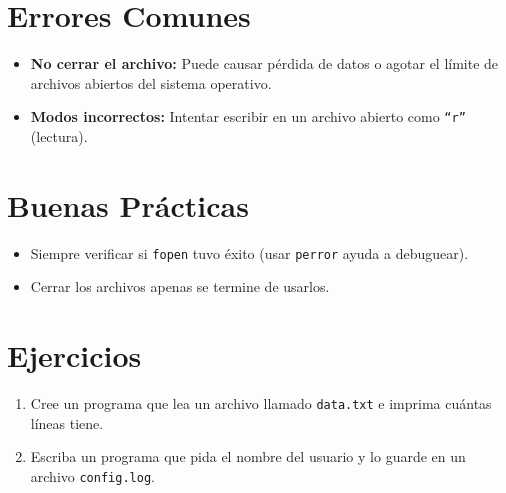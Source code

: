 \documentclass[12pt,a4paper]{article}
\begin{document}
\section{Errores Comunes}
\begin{itemize}
    \item \textbf{No cerrar el archivo:} Puede causar pérdida de datos o agotar el límite de archivos abiertos del sistema operativo.
    \item \textbf{Modos incorrectos:} Intentar escribir en un archivo abierto como \texttt{``r''} (lectura).
\end{itemize}

\section{Buenas Prácticas}
\begin{itemize}
    \item Siempre verificar si \texttt{fopen} tuvo éxito (usar \texttt{perror} ayuda a debuguear).
    \item Cerrar los archivos apenas se termine de usarlos.
\end{itemize}

\section{Ejercicios}
\begin{enumerate} 
    \item Cree un programa que lea un archivo llamado \texttt{data.txt} e imprima cuántas líneas tiene.
    \item Escriba un programa que pida el nombre del usuario y lo guarde en un archivo \texttt{config.log}.
\end{enumerate}
\end{document}
